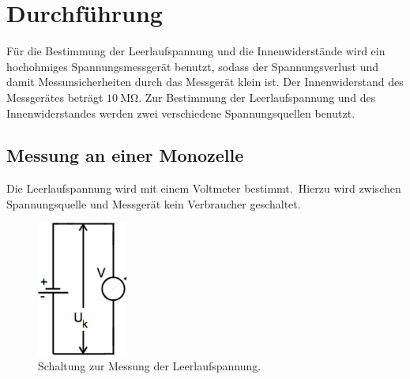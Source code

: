 \section{Durchführung}
\label{sec:Durchfuehrung}
Für die Bestimmung der Leerlaufspannung und die Innenwiderstände wird ein hochohmiges Spannungsmessgerät benutzt, sodass der Spannungsverlust und damit Messunsicherheiten durch das Messgerät klein ist.
Der Innenwiderstand des Messgerätes beträgt $\SI{10}{\mega\ohm}$.
Zur Bestimmung der Leerlaufspannung und des Innenwiderstandes werden zwei verschiedene Spannungsquellen benutzt.

\subsection{Messung an einer Monozelle}
\label{sec:drchf_monozelle}
Die Leerlaufspannung wird mit einem Voltmeter bestimmt.\
Hierzu wird zwischen Spannungsquelle und Messgerät kein Verbraucher geschaltet.
\begin{figure}
	\centering
	\includegraphics[width=3cm]{Bilder/Leerlauf.pdf}
	\caption{Schaltung zur Messung der Leerlaufspannung.}
	\label{fig:leerlauf}
\end{figure}

